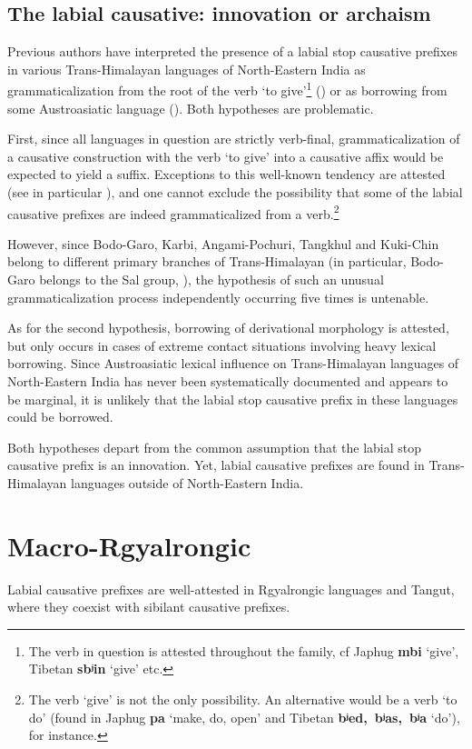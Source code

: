 \documentclass[oneside,a4paper,11pt]{article}
\newcommand{\ipa}[1]{\textbf{{\phon\mbox{#1}}}} %
\newcommand{\forme}[2]{\ipa{#1} `#2'}
\begin{document}
 
\subsection{The labial causative: innovation or archaism} \label{sec:innovation}
Previous authors have interpreted the presence of a labial stop causative prefixes in various Trans-Himalayan languages of North-Eastern India as  grammaticalization from the root of the verb `to give'\footnote{The verb in question is attested throughout the family, cf Japhug \forme{mbi}{give}, Tibetan \forme{sbʲin}{give} etc.}
(\citealt[132]{matisoff03}) or as borrowing from some Austroasiatic language (\citealt{maspero46, konnerth15cisloc, delancey15adjectival}). Both hypotheses are problematic. 

First, since all languages in question are strictly verb-final, grammaticalization of a causative construction with the verb `to give' into a causative affix would be expected to yield a suffix. Exceptions to this well-known tendency are attested (see in particular \citealt{jacques13harmonization}), and one cannot exclude the possibility that some of the labial causative prefixes are indeed grammaticalized from a verb.\footnote{The verb `give' is not the only possibility. An alternative would be a verb `to do' (found in Japhug \forme{pa}{make, do, open} and Tibetan \forme{bʲed, bʲas, bʲa}{do}), for instance.} 

However, since  Bodo-Garo, Karbi, Angami-Pochuri, Tangkhul and Kuki-Chin belong to different primary branches of Trans-Himalayan (in particular, Bodo-Garo belongs to the Sal group, \citealt{burling83sal}), the hypothesis of such an unusual grammaticalization process independently occurring five times is untenable.

As for the second hypothesis, borrowing of derivational morphology is attested, but only occurs in cases of extreme contact situations involving heavy lexical borrowing. Since Austroasiatic lexical influence on Trans-Himalayan languages of North-Eastern India has never been systematically documented and appears to be marginal, it is unlikely that the labial stop causative prefix in these languages could be borrowed.

Both hypotheses depart from the common assumption that the labial stop causative prefix is an innovation. Yet, labial causative prefixes are found in Trans-Himalayan languages outside of North-Eastern India. 

\section{Macro-Rgyalrongic}
Labial causative prefixes are well-attested in Rgyalrongic languages and Tangut, where they coexist with sibilant causative prefixes.
\end{document}
